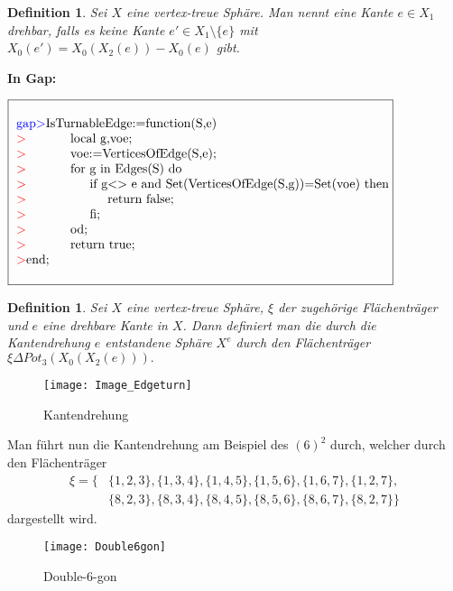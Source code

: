 \documentclass[12pt,titlepage,twoside,cleardoublepage]{article}
\theoremstyle{nummermitklammern}
\newtheorem{definition}[temp]{Definition}
\newtheorem{definition}[zahl]{Definition}
\numberwithin{equation}{section}
\begin{document}
\begin{definition}
Sei $X$ eine vertex-treue Sphäre. Man nennt eine Kante $e\in X_1$ \emph{drehbar}, falls es keine Kante $e'\in X_1\setminus \{e\}$ mit $X_0(e')=X_0(X_2(e))-X_0(e)$ gibt.
\end{definition}
\textbf{In Gap:}
\begin{center}
$\fbox{
\parbox{14cm}{
\begin{tabbing}
\textcolor{blue}{gap$>$}IsTu\=rnableEdge:=function(S,e)\\
\textcolor{red}{$>$}\> local g,voe;\\
\textcolor{red}{$>$}\> voe:=VerticesOfEdge(S,e);\\
\textcolor{red}{$>$}\> for \=g in Edges(S) do\\
\textcolor{red}{$>$}\>\> if g\=$<>$ e and Set(VerticesOfEdge(S,g))=Set(voe) then\\
\textcolor{red}{$>$}\>\>\> return false;\\
\textcolor{red}{$>$}\>\> fi;\\
\textcolor{red}{$>$}\> od;\\
\textcolor{red}{$>$}\> return true;\\
\textcolor{red}{$>$}end;
\end{tabbing}
}}$
\end{center}
\begin{definition}
Sei $X$ eine vertex-treue Sphäre, $\xi$ der zugehörige Flächenträger und $e$ eine drehbare Kante in $X$. Dann definiert man die durch die Kantendrehung $e$ entstandene Sphäre $X^e$ durch den Flächenträger $\xi \Delta Pot_3(X_0(X_2(e))).$
\end{definition}
\begin{figure}[H]
\begin{center}
\texttt{[image: Image\_Edgeturn]}
\end{center}
\caption{Kantendrehung}
\end{figure}
 Man führt nun die Kantendrehung am Beispiel des $(6)^2$  durch, welcher durch den Flächenträger
\begin{align*}
\xi=\{&\{1,2,3\},\{1,3,4\},\{1,4,5\},\{1,5,6\},\{1,6,7\},\{1,2,7\},\\ 
&\{8,2,3\},\{8,3,4\},\{8,4,5\},\{8,5,6\},\{8,6,7\},\{8,2,7\}\}
\end{align*}
dargestellt wird. 
\begin{figure}[H]
\begin{center}
\texttt{[image: Double6gon]}
\end{center}
\caption{Double-6-gon }
\end{figure}
\end{document}
